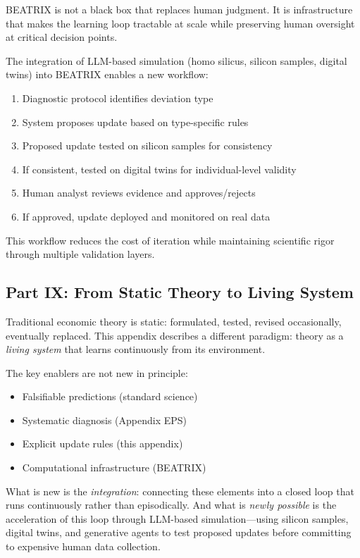 BEATRIX is not a black box that replaces human judgment. It is infrastructure 
that makes the learning loop tractable at scale while preserving human oversight 
at critical decision points.

The integration of LLM-based simulation (homo silicus, silicon samples, digital 
twins) into BEATRIX enables a new workflow:
\begin{enumerate}
    \item Diagnostic protocol identifies deviation type
    \item System proposes update based on type-specific rules
    \item Proposed update tested on silicon samples for consistency
    \item If consistent, tested on digital twins for individual-level validity
    \item Human analyst reviews evidence and approves/rejects
    \item If approved, update deployed and monitored on real data
\end{enumerate}

This workflow reduces the cost of iteration while maintaining scientific rigor 
through multiple validation layers.

\subsection{Part IX: From Static Theory to Living System}

Traditional economic theory is static: formulated, tested, revised occasionally, 
eventually replaced. This appendix describes a different paradigm: theory as a 
\emph{living system} that learns continuously from its environment.

The key enablers are not new in principle:
\begin{itemize}
    \item Falsifiable predictions (standard science)
    \item Systematic diagnosis (Appendix EPS)
    \item Explicit update rules (this appendix)
    \item Computational infrastructure (BEATRIX)
\end{itemize}

What is new is the \emph{integration}: connecting these elements into a 
closed loop that runs continuously rather than episodically. And what is 
\emph{newly possible} is the acceleration of this loop through LLM-based 
simulation---using silicon samples, digital twins, and generative agents to 
test proposed updates before committing to expensive human data collection.

